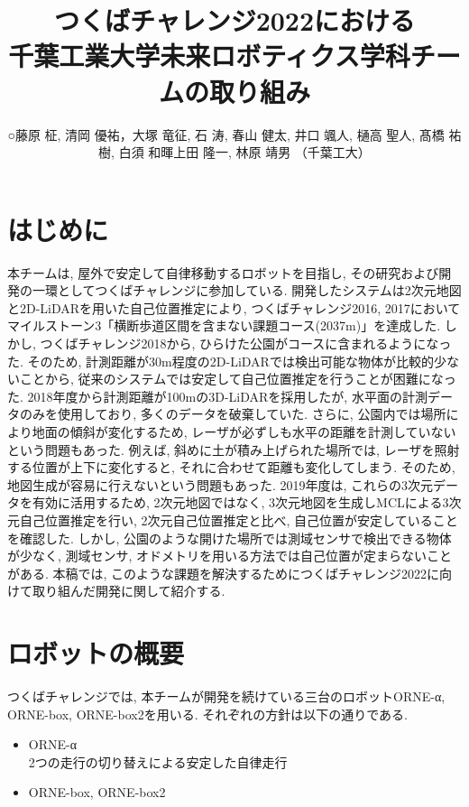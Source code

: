 \documentclass[uplatex, twocolumn, 9pt]{jsproceedings}
\title{つくばチャレンジ2022における\\千葉工業大学未来ロボティクス学科チームの取り組み}
\author{○藤原 柾, 清岡 優祐，大塚 竜征, 石 涛, 春山 健太, 井口 颯人, 樋高 聖人, 髙橋 祐樹, 白須 和暉\newline 上田 隆一, 林原 靖男 （千葉工大）}
\affiliation{千葉工業大学未来ロボティクス学科チームα, box, box2}
\begin{document}
\maketitle


\section{はじめに}
本チームは, 屋外で安定して自律移動するロボットを目指し, その研究および開発の一環としてつくばチャレンジに参加している. 開発したシステムは2次元地図と2D-LiDARを用いた自己位置推定により, つくばチャレンジ2016, 2017においてマイルストーン3「横断歩道区間を含まない課題コース(2037m)」を達成した. しかし, つくばチャレンジ2018から, ひらけた公園がコースに含まれるようになった. そのため, 計測距離が30m程度の2D-LiDARでは検出可能な物体が比較的少ないことから, 従来のシステムでは安定して自己位置推定を行うことが困難になった. 2018年度から計測距離が100mの3D-LiDARを採用したが, 水平面の計測データのみを使用しており, 多くのデータを破棄していた. さらに, 公園内では場所により地面の傾斜が変化するため, レーザが必ずしも水平の距離を計測していないという問題もあった. 例えば, 斜めに土が積み上げられた場所では, レーザを照射する位置が上下に変化すると, それに合わせて距離も変化してしまう. そのため, 地図生成が容易に行えないという問題もあった. 2019年度は, これらの3次元データを有効に活用するため, 2次元地図ではなく, 3次元地図を生成しMCLによる3次元自己位置推定を行い, 2次元自己位置推定と比べ, 自己位置が安定していることを確認した. しかし, 公園のような開けた場所では測域センサで検出できる物体が少なく, 測域センサ, オドメトリを用いる方法では自己位置が定まらないことがある. 本稿では, このような課題を解決するためにつくばチャレンジ2022に向けて取り組んだ開発に関して紹介する. 

\section{ロボットの概要}
つくばチャレンジでは, 本チームが開発を続けている三台のロボットORNE-α, ORNE-box\cite{si-box}, ORNE-box2を用いる. それぞれの方針は以下の通りである. 
\begin{itemize}
  \item ORNE-α\\2つの走行の切り替えによる安定した自律走行
  \item ORNE-box, ORNE-box2\\ 
\end{itemize}
\end{document}
